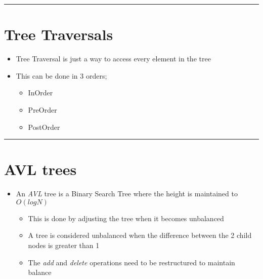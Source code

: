 \documentclass{article}
\begin{document}
\begin{center}
  \rule{0.5\textwidth}{0.4pt}
\end{center}

\section{Tree Traversals}
\begin{itemize}
  \item{Tree Traversal is just a way to access every element in the tree}
  \item{This can be done in 3 orders;}
  \begin{itemize}
    \item{InOrder}
    \item{PreOrder}
    \item{PostOrder}
  \end{itemize}
\end{itemize}

\begin{center}
  \rule{0.5\textwidth}{0.4pt}
\end{center}

\pagebreak

\section{AVL trees}
\begin{itemize}
  \item{An \textit{AVL} tree is a Binary Search Tree where the height is maintained to $O(logN)$}
  \begin{itemize}
    \item{This is done by adjusting the tree when it becomes unbalanced}
    \item{A tree is considered unbalanced when the difference between the 2 child nodes is greater than 1}
    \item{The \textit{add} and \textit{delete} operations need to be restructured to maintain balance}
  \end{itemize}
\end{itemize}
\end{document}
